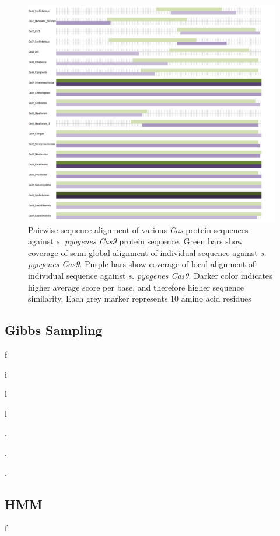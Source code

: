 \documentclass[11pt, oneside]{article}
\begin{document}
\begin{figure}[ht]
  \centering
  \includegraphics[scale = 0.45]{images/dp_figure2}
      \caption{Pairwise sequence alignment of various \textit{Cas} protein sequences against \textit{s. pyogenes Cas9} protein sequence. Green bars show coverage of semi-global alignment of individual sequence against \textit{s. pyogenes Cas9}. Purple bars show coverage of local alignment of individual sequence against \textit{s. pyogenes Cas9}. Darker color indicates higher average score per base, and therefore higher sequence similarity. Each grey marker represents 10 amino acid residues}
      \label{dp2}
\end{figure}

\subsection{Gibbs Sampling}

f

i

l

l

.

.

.




\subsection{HMM}


f
\end{document}

